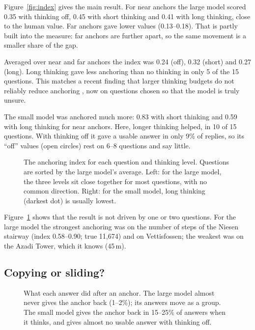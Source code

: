 \documentclass[11pt,a4paper]{article}
\begin{document}
Figure~\ref{fig:index} gives the main result. For near anchors the large model scored 0.35 with thinking off, 0.45 with short thinking and 0.41 with long thinking, close to the human value. Far anchors gave lower values (0.13--0.18). That is partly built into the measure: far anchors are further apart, so the same movement is a smaller share of the gap.

\begin{keybox}
Averaged over near and far anchors the index was 0.24 (off), 0.32 (short) and 0.27 (long). Long thinking gave less anchoring than no thinking in only 5 of the 15 questions. This matches a recent finding that larger thinking budgets do not reliably reduce anchoring \citep{kraishan2026long}, now on questions chosen so that the model is truly unsure.
\end{keybox}

The small model was anchored much more: 0.83 with short thinking and 0.59 with long thinking for near anchors. Here, longer thinking helped, in 10 of 15 questions. With thinking off it gave a usable answer in only 9\% of replies, so its \enquote{off} values (open circles) rest on 6--8 questions and say little.

\begin{figure}[ht]
\centering{}
\caption{The anchoring index for each question and thinking level. Questions are sorted by the large model's average. Left: for the large model, the three levels sit close together for most questions, with no common direction. Right: for the small model, long thinking (darkest dot) is usually lowest.}
\label{fig:items}
\end{figure}

Figure~\ref{fig:items} shows that the result is not driven by one or two questions. For the large model the strongest anchoring was on the number of steps of the Niesen stairway (index 0.58--0.90; true 11,674) and on Vettisfossen; the weakest was on the Azadi Tower, which it knows (45\,m).

\subsection{Copying or sliding?}

\begin{figure}[ht]
\centering{}
\caption{What each answer did after an anchor. The large model almost never gives the anchor back (1--2\%); its answers move as a group. The small model gives the anchor back in 15--25\% of answers when it thinks, and gives almost no usable answer with thinking off.}
\label{fig:outcomes}
\end{figure}
\end{document}
